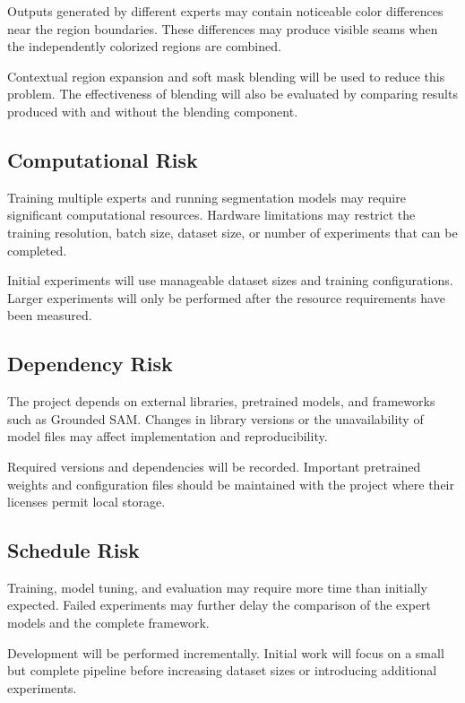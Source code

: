 \documentclass{FastFyp}
\begin{document}
Outputs generated by different experts may contain noticeable color differences near the region boundaries. These differences may produce visible seams when the independently colorized regions are combined.

Contextual region expansion and soft mask blending will be used to reduce this problem. The effectiveness of blending will also be evaluated by comparing results produced with and without the blending component.

\subsection{Computational Risk}

Training multiple experts and running segmentation models may require significant computational resources. Hardware limitations may restrict the training resolution, batch size, dataset size, or number of experiments that can be completed.

Initial experiments will use manageable dataset sizes and training configurations. Larger experiments will only be performed after the resource requirements have been measured.

\subsection{Dependency Risk}

The project depends on external libraries, pretrained models, and frameworks such as Grounded SAM. Changes in library versions or the unavailability of model files may affect implementation and reproducibility.

Required versions and dependencies will be recorded. Important pretrained weights and configuration files should be maintained with the project where their licenses permit local storage.

\subsection{Schedule Risk}

Training, model tuning, and evaluation may require more time than initially expected. Failed experiments may further delay the comparison of the expert models and the complete framework.

Development will be performed incrementally. Initial work will focus on a small but complete pipeline before increasing dataset sizes or introducing additional experiments.
\end{document}

